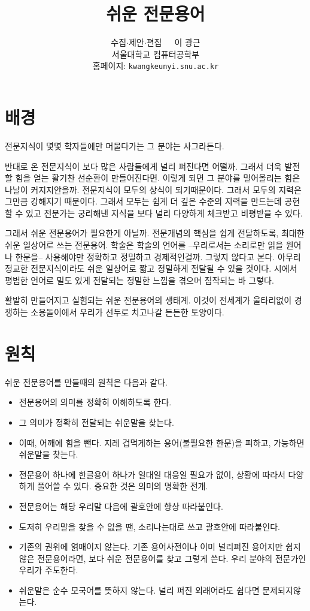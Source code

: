 \documentclass[11pt]{article}
\title{쉬운 전문용어}
\author{수집\(\cdot\)제안\(\cdot\)편집\ \ \  이 광근\\
  서울대학교 컴퓨터공학부\\
  홈페이지: \texttt{kwangkeunyi.snu.ac.kr}
}
\date{}
\begin{document}
\maketitle

\section*{배경}
전문지식이 몇몇 학자들에만 머물다가는 그 분야는 사그라든다. 

반대로 온 전문지식이 보다 많은 사람들에게 널리 퍼진다면 어떨까. 그래서
더욱 발전할 힘을 얻는 활기찬 선순환이 만들어진다면. 이렇게 되면 그
분야를 밀어올리는 힘은 나날이 커지지안을까. 전문지식이 모두의 상식이
되기때문이다. 그래서 모두의 지력은 그만큼 강해지기 때문이다. 그래서 모두는 쉽게
더 깊은 수준의 지력을 만드는데 공헌할 수 있고 전문가는 궁리해낸 지식을
보다 널리 다양하게 체크받고 비평받을 수 있다.

그래서 쉬운 전문용어가 필요한게 아닐까. 전문개념의 핵심을 쉽게 전달하도록,
최대한 쉬운 일상어로 쓰는 전문용어. 학술은 학술의 언어를
--우리로서는 소리로만 읽을 원어나 한문을-- 사용해야만 정확하고
정밀하고 경제적인걸까. 그렇지 않다고 본다. 아무리 정교한 전문지식이라도 쉬운
일상어로 짧고 정밀하게 전달될 수 있을 것이다. 시에서 평범한 언어로 밀도 있게
전달되는 정밀한 느낌을 겪으며 짐작되는 바 그렇다. 

활발히 만들어지고 실험되는 쉬운 전문용어의 생태계. 이것이 전세계가 울타리없이
경쟁하는 소용돌이에서 우리가 선두로 치고나갈 든든한 토양이다.

\section*{원칙}
쉬운 전문용어를 만들때의 원칙은 다음과 같다.
\begin{itemize}
\item 전문용어의 의미를 정확히 이해하도록 한다.
\item 그 의미가 정확히 전달되는 쉬운말을 찾는다.
\item 이때, 어깨에 힘을 뺀다. 지레 겁먹게하는 용어(불필요한 한문)을 피하고, 가능하면
  쉬운말을 찾는다. 
\item 전문용어 하나에 한글용어 하나가 일대일 대응일 필요가 없이,
  상황에 따라서 다양하게 풀어쓸 수 있다. 중요한 것은 의미의 명확한
  전개.
\item 전문용어는 해당 우리말 다음에 괄호안에 항상 따라붙인다.
\item 도저히 우리말을 찾을 수 없을 땐, 소리나는대로 쓰고 괄호안에
  따라붙인다. 
\item 기존의 권위에 얽매이지 않는다. 기존 용어사전이나 이미 널리퍼진
  용어지만 쉽지않은 전문용어라면, 보다 쉬운 전문용어를 찾고 그렇게
  쓴다. 우리 분야의 전문가인 우리가 주도한다.
\item 쉬운말은 순수 모국어를 뜻하지 않는다. 널리 퍼진 외래어라도
  쉽다면 문제되지않는다.
\end{itemize}



\printindex
\end{document}
